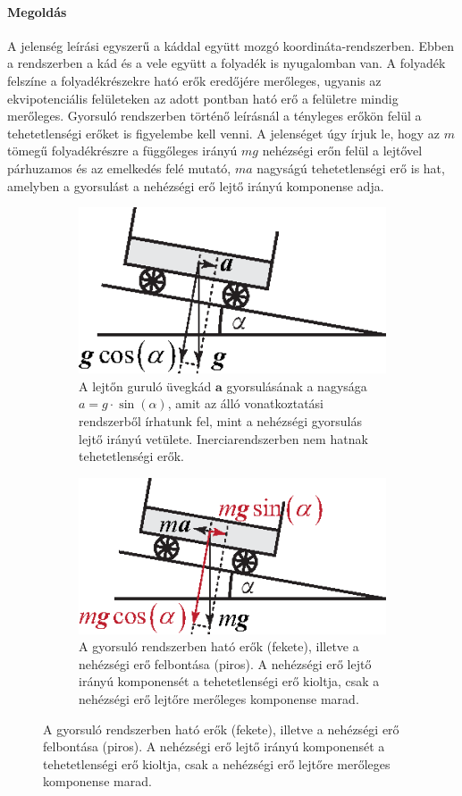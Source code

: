 \documentclass[12pt,a4paper]{scrartcl}
\let\mathbf\bm
\begin{document}
\paragraph{Megoldás}
A jelenség leírási egyszerű a káddal együtt mozgó koordináta-rendszerben. Ebben a rendszerben a kád és a vele együtt a folyadék is nyugalomban van. A folyadék felszíne a folyadékrészekre ható erők eredőjére merőleges, ugyanis az ekvipotenciális felületeken az adott pontban ható erő a felületre mindig merőleges. Gyorsuló rendszerben történő leírásnál a tényleges erőkön felül a tehetetlenségi erőket is figyelembe kell venni. A jelenséget úgy írjuk le, hogy az $m$ tömegű folyadékrészre a függőleges irányú $mg$ nehézségi erőn felül a lejtővel párhuzamos és az emelkedés felé mutató, $ma$ nagyságú tehetetlenségi erő is hat, amelyben a gyorsulást a nehézségi erő lejtő irányú komponense adja.

\begin{figure}[htb] 
\begin{subfigure}[b]{0.45\textwidth}
\centering
\includegraphics[scale=1]{figs/uvegkad_a.eps}
\caption{A lejtőn guruló üvegkád ${\mathbf{a}}$ gyorsulásának a nagysága $a = g \cdot \sin \left( \alpha \right)$, amit az álló vonatkoztatási rendszerből írhatunk fel, mint a nehézségi gyorsulás lejtő irányú vetülete. Inerciarendszerben nem hatnak tehetetlenségi erők.}
\end{subfigure}
\begin{subfigure}[b]{0.45\textwidth}
\centering
\includegraphics[scale=1]{figs/uvegkad_b.eps}
\caption{A gyorsuló rendszerben ható erők (fekete), illetve a nehézségi erő felbontása (piros). A nehézségi erő lejtő irányú komponensét a tehetetlenségi erő kioltja, csak a nehézségi erő lejtőre merőleges komponense marad.}
\end{subfigure}
\label{fig:uvegkad}
\end{figure}
\FloatBarrier
\end{document}
